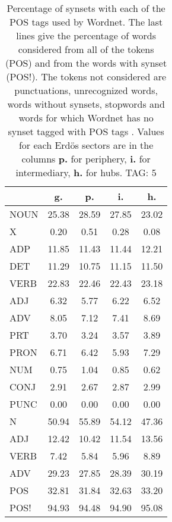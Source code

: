\begin{table}[h!]
\begin{center}
\begin{tabular}{| l || c | c | c | c |}\hline
 & {\bf g.} & {\bf p.} & {\bf i.} & {\bf h.} \\\hline\hline
NOUN & 25.38  & 28.59  & 27.85  & 23.02 \\
X & 0.20  & 0.51  & 0.28  & 0.08 \\\hline
ADP & 11.85  & 11.43  & 11.44  & 12.21 \\
DET & 11.29  & 10.75  & 11.15  & 11.50 \\\hline
VERB & 22.83  & 22.46  & 22.43  & 23.18 \\\hline
ADJ & 6.32  & 5.77  & 6.22  & 6.52 \\
ADV & 8.05  & 7.12  & 7.41  & 8.69 \\\hline
PRT & 3.70  & 3.24  & 3.57  & 3.89 \\
PRON & 6.71  & 6.42  & 5.93  & 7.29 \\
NUM & 0.75  & 1.04  & 0.85  & 0.62 \\
CONJ & 2.91  & 2.67  & 2.87  & 2.99 \\
PUNC & 0.00  & 0.00  & 0.00  & 0.00 \\\hline\hline\hline
N & 50.94  & 55.89  & 54.12  & 47.36 \\\hline
ADJ & 12.42  & 10.42  & 11.54  & 13.56 \\\hline
VERB & 7.42  & 5.84  & 5.96  & 8.89 \\\hline
ADV & 29.23  & 27.85  & 28.39  & 30.19 \\\hline\hline
POS & 32.81  & 31.84  & 32.63  & 33.20 \\\hline
POS! & 94.93  & 94.48  & 94.90  & 95.08 \\\hline
\end{tabular}
\caption{Percentage of synsets with each of the POS tags used by Wordnet. The last lines give the percentage of words considered from all of the tokens (POS) and from the words with synset (POS!). The tokens not considered are punctuations, unrecognized words, words without synsets, stopwords and words for which Wordnet has no synset  tagged with POS tags . Values for each Erd\"os sectors are in the columns {{\bf p.}} for periphery, {{\bf i.}} for intermediary, {{\bf h.}} for hubs. TAG: 5}
\end{center}
\end{table}